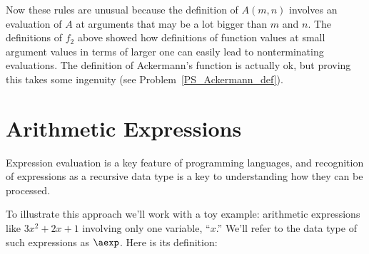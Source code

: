 Now these rules are unusual because the definition of $A(m,n)$
involves an evaluation of $A$ at arguments that may be a lot bigger
than $m$ and $n$.  The definitions of $f_2$ above showed how
definitions of function values at small argument values in terms of
larger one can easily lead to nonterminating evaluations.  The
definition of Ackermann's function is actually ok, but proving this
takes some ingenuity (see Problem~\ref{PS_Ackermann_def}).
                            
\begin{problems}
\homeworkproblems
{}
\end{problems}

\section{Arithmetic Expressions}\label{aexp_sec}
Expression evaluation is a key feature of programming languages, and
recognition of expressions as a recursive data type is a key to
understanding how they can be processed.

To illustrate this approach we'll work with a toy example: arithmetic
expressions like $3x^2 + 2x + 1$ involving only one variable, ``$x$.''
We'll refer to the data type of such expressions as $\aexp$.  Here is its
definition:

